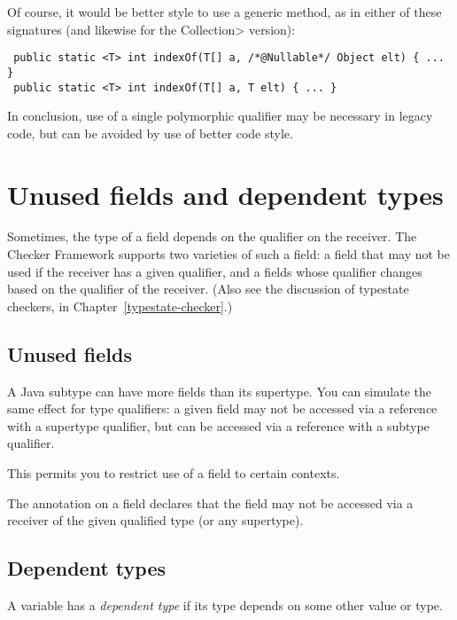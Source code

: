 Of course, it would be better style to use a generic method, as in either
of these signatures (and likewise for the \<Collection> version):

\begin{Verbatim}
 public static <T> int indexOf(T[] a, /*@Nullable*/ Object elt) { ... }
 public static <T> int indexOf(T[] a, T elt) { ... }
\end{Verbatim}

In conclusion, use of a single polymorphic qualifier may be necessary in
legacy code, but can be avoided by use of better code style.


\section{Unused fields and dependent types\label{unused-fields-and-dependent-types}}

Sometimes, the type of a field depends on the qualifier on the receiver.
The Checker Framework supports two varieties of such a field:  a field that
may not be used if the receiver has a given qualifier, and a fields whose
qualifier changes based on the qualifier of the receiver.
(Also see the discussion of typestate checkers, in
Chapter~\ref{typestate-checker}.)


\subsection{Unused fields\label{unused-fields}}

A Java subtype can have more fields than its supertype.  You can simulate
the same effect for type qualifiers:  a given field may not be accessed via
a reference with a supertype qualifier, but can be accessed via a reference
with a subtype qualifier.

This permits you to restrict use of a field to certain contexts.

The  annotation
on a field declares that the field may not be accessed via a receiver of
the given qualified type (or any supertype).


\subsection{Dependent types\label{dependent-types}}

A variable has a \emph{dependent type} if its type depends on some other
value or type.

